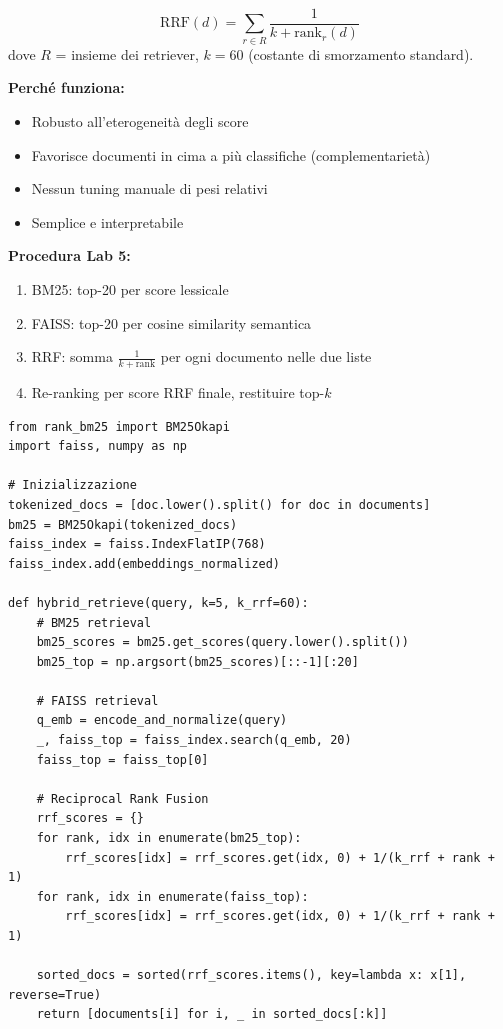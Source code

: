 \documentclass[12pt,a4paper]{article}
\begin{document}
\begin{formulabox}
\[
\text{RRF}(d) = \sum_{r \in R} \frac{1}{k + \text{rank}_r(d)}
\]
dove $R$ = insieme dei retriever, $k = 60$ (costante di smorzamento standard).
\end{formulabox}

\textbf{Perch\'e funziona:}
\begin{itemize}
  \item Robusto all'eterogeneit\`a degli score
  \item Favorisce documenti in cima a pi\`u classifiche (complementariet\`a)
  \item Nessun tuning manuale di pesi relativi
  \item Semplice e interpretabile
\end{itemize}

\textbf{Procedura Lab 5:}
\begin{enumerate}
  \item BM25: top-20 per score lessicale
  \item FAISS: top-20 per cosine similarity semantica
  \item RRF: somma $\frac{1}{k+\text{rank}}$ per ogni documento nelle due liste
  \item Re-ranking per score RRF finale, restituire top-$k$
\end{enumerate}

\begin{codebox}
\begin{lstlisting}[style=python]
from rank_bm25 import BM25Okapi
import faiss, numpy as np

# Inizializzazione
tokenized_docs = [doc.lower().split() for doc in documents]
bm25 = BM25Okapi(tokenized_docs)
faiss_index = faiss.IndexFlatIP(768)
faiss_index.add(embeddings_normalized)

def hybrid_retrieve(query, k=5, k_rrf=60):
    # BM25 retrieval
    bm25_scores = bm25.get_scores(query.lower().split())
    bm25_top = np.argsort(bm25_scores)[::-1][:20]

    # FAISS retrieval
    q_emb = encode_and_normalize(query)
    _, faiss_top = faiss_index.search(q_emb, 20)
    faiss_top = faiss_top[0]

    # Reciprocal Rank Fusion
    rrf_scores = {}
    for rank, idx in enumerate(bm25_top):
        rrf_scores[idx] = rrf_scores.get(idx, 0) + 1/(k_rrf + rank + 1)
    for rank, idx in enumerate(faiss_top):
        rrf_scores[idx] = rrf_scores.get(idx, 0) + 1/(k_rrf + rank + 1)

    sorted_docs = sorted(rrf_scores.items(), key=lambda x: x[1], reverse=True)
    return [documents[i] for i, _ in sorted_docs[:k]]
\end{lstlisting}
\end{codebox}
\end{document}
